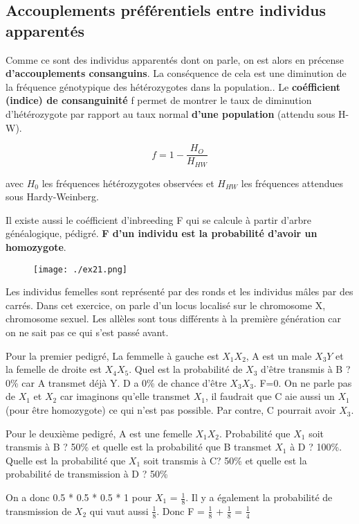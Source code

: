 \documentclass{article}
\begin{document}
\subsection{Accouplements préférentiels entre individus apparentés}

Comme ce sont des individus apparentés dont on parle, on est alors en précense \textbf{d'accouplements consanguins}. La conséquence de cela est une {diminution de la fréquence génotypique des hétérozygotes dans la population.}. Le \textbf{coéfficient (indice) de consanguinité} f permet de montrer le taux de diminution d'hétérozygote par rapport au taux normal \textbf{d'une population} (attendu sous H-W).

\begin{equation}
f = 1 - \frac{H_O}{H_{HW}}
\end{equation}

avec $H_0$ les fréquences hétérozygotes observées et $H_{HW}$ les fréquences attendues sous Hardy-Weinberg.

Il existe aussi le coéfficient d'inbreeding F qui se calcule à partir d'arbre généalogique, pédigré. \textbf{F d'un individu est la probabilité d'avoir un homozygote}.

\begin{figure}[H]
\texttt{[image: ./ex21.png]}
\end{figure}

Les individus femelles sont représenté par des ronds et les individus mâles par des carrés. Dans cet exercice, on parle d'un locus localisé sur le chromosome X, chromosome sexuel. Les allèles sont tous différents à la première génération car on ne sait pas ce qui s'est passé avant.

Pour la premier pedigré, La femmelle à gauche est $X_1X_2$, A est un male $X_3Y$ et la femelle de droite est $X_4X_5$. Quel est la probabilité de $X_3$ d'être transmis à B ? 0\% car A transmet déjà Y. D a 0\% de chance d'être $X_3X_3$. F=0. On ne parle pas de $X_1$ et $X_2$ car imaginons qu'elle transmet $X_1$, il faudrait que C aie aussi un $X_1$ (pour être homozygote) ce qui n'est pas possible. Par contre, C pourrait avoir $X_3$.


Pour le deuxième pedigré, A est une femelle $X_1X_2$. Probabilité que $X_1$ soit transmis à B ? 50\% et quelle est la probabilité que B transmet $X_1$ à D ? 100\%. Quelle est la probabilité que $X_1$ soit transmis à C? 50\% et quelle est la probabilité de transmission à D ? 50\%

On a donc 0.5 * 0.5 * 0.5 * 1 pour $X_1$ = $\frac{1}{8}$. Il y a également la probabilité de transmission de $X_2$ qui vaut aussi $\frac{1}{8}$. Donc F = $\frac{1}{8}$ + $\frac{1}{8}$ = $\frac{1}{4}$
\end{document}
